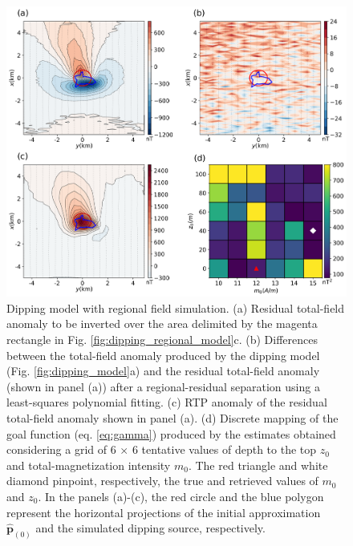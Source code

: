\begin{figure}
    \centering
    \includegraphics[width=\linewidth]{figures/regional_rtp.png}
    \caption{Dipping model with regional field simulation. (a) Residual total-field anomaly to be inverted over the area delimited by the  magenta rectangle 
    in Fig. \ref{fig:dipping_regional_model}c. 
    (b) Differences between the total-field anomaly produced by the dipping model
(Fig. \ref{fig:dipping_model}a) and the residual total-field anomaly (shown in panel (a)) after a regional-residual separation using a least-squares polynomial fitting. 
(c) RTP anomaly of the  residual total-field anomaly shown in panel (a). 
(d) Discrete mapping of the goal function (eq. \ref{eq:gamma}) produced by the estimates   	       obtained considering a grid of 6 $\times$ 6 tentative values of 
	   depth to the top $z_0$ and total-magnetization intensity $m_0$. 
	   The red triangle  and white diamond pinpoint, respectively, the true and retrieved 	   
	   values of $m_0$  and $z_0$.   
	   In the panels (a)-(c), the red circle and the blue polygon represent the horizontal projections 	of the initial approximation $\hat{\mathbf{p}}_{(0)}$ and  the simulated dipping source, respectively.
}
    \label{fig:dipping_regional_rtp}
\end{figure}



